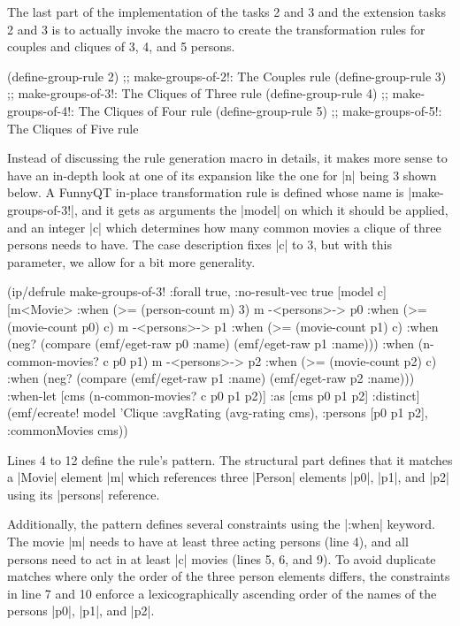\documentclass[submission]{eptcs}
\newcommand{\code}{\clojureinline}
\begin{document}
The last part of the implementation of the tasks 2 and 3 and the extension
tasks 2 and 3 is to actually invoke the macro to create the transformation
rules for couples and cliques of 3, 4, and 5 persons.

\begin{clojurecode}
(define-group-rule 2) ;; make-groups-of-2!: The Couples rule
(define-group-rule 3) ;; make-groups-of-3!: The Cliques of Three rule
(define-group-rule 4) ;; make-groups-of-4!: The Cliques of Four rule
(define-group-rule 5) ;; make-groups-of-5!: The Cliques of Five rule
\end{clojurecode}

Instead of discussing the rule generation macro in details, it makes more sense
to have an in-depth look at one of its expansion like the one for \code|n|
being 3 shown below.  A FunnyQT in-place transformation rule is defined whose
name is \code|make-groups-of-3!|, and it gets as arguments the \code|model| on
which it should be applied, and an integer \code|c| which determines how many
common movies a clique of three persons needs to have.  The case description
fixes \code|c| to 3, but with this parameter, we allow for a bit more
generality.

\begin{clojurecode}
(ip/defrule make-groups-of-3!
  {:forall true, :no-result-vec true}
  [model c]
  [m<Movie>           :when (>= (person-count m) 3)
   m -<persons>-> p0  :when (>= (movie-count p0) c)
   m -<persons>-> p1  :when (>= (movie-count p1) c)
                      :when (neg? (compare (emf/eget-raw p0 :name) (emf/eget-raw p1 :name)))
                      :when (n-common-movies? c p0 p1)
   m -<persons>-> p2  :when (>= (movie-count p2) c)
                      :when (neg? (compare (emf/eget-raw p1 :name) (emf/eget-raw p2 :name)))
   :when-let [cms (n-common-movies? c p0 p1 p2)]
   :as [cms p0 p1 p2] :distinct]
  (emf/ecreate! model 'Clique {:avgRating (avg-rating cms), :persons [p0 p1 p2], :commonMovies cms}))
\end{clojurecode}

Lines 4 to 12 define the rule's pattern.  The structural part defines that it
matches a \code|Movie| element \code|m| which references three \code|Person|
elements \code|p0|, \code|p1|, and \code|p2| using its \code|persons|
reference.

Additionally, the pattern defines several constraints using the \code|:when|
keyword.  The movie \code|m| needs to have at least three acting persons (line
4), and all persons need to act in at least \code|c| movies (lines 5, 6, and
9).  To avoid duplicate matches where only the order of the three person
elements differs, the constraints in line 7 and 10 enforce a lexicographically
ascending order of the names of the persons \code|p0|, \code|p1|, and
\code|p2|.
\end{document}
